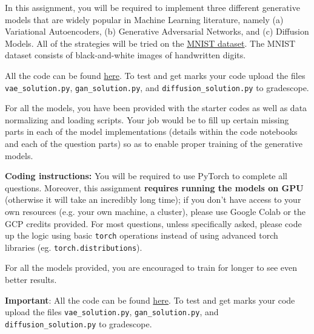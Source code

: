 \documentclass[12pt]{article}
\theoremstyle{definition}
\begin{document}
\renewcommand{\labelitemi}{\textbullet}

In this assignment, you will be required to implement three different generative models that are widely popular in Machine Learning literature, namely (a) Variational Autoencoders, (b) Generative Adversarial Networks, and (c) Diffusion Models. All of the strategies will be tried on the \href{https://huggingface.co/datasets/mnist}{MNIST dataset}. The MNIST dataset consists of black-and-white images of handwritten digits. 

All the code can be found \href{https://drive.google.com/file/d/1Y1IkDUFmEIocBRJd3cbt8747QEtMiM5R/view?usp=sharing}{here}. To test and get marks your code upload the files \texttt{vae\_solution.py}, \texttt{gan\_solution.py}, and \texttt{diffusion\_solution.py} to gradescope.

For all the models, you have been provided with the starter codes as well as data normalizing and loading scripts. Your job would be to fill up certain missing parts in each of the model implementations (details within the code notebooks and each of the question parts) so as to enable proper training of the generative models.

\textbf{Coding instructions:} You will be required to use PyTorch to complete all questions. Moreover, this assignment \textbf{requires running the models on GPU} (otherwise it will take an incredibly long time); if you don't have access to your own resources (e.g. your own machine, a cluster), please use Google Colab or the GCP credits provided. For most questions, unless specifically asked, please code up the logic using basic \texttt{torch} operations instead of using advanced torch libraries (eg. \texttt{torch.distributions}).

For all the models provided, you are encouraged to train for longer to see even better results.

\textbf{Important}: All the code can be found \href{https://drive.google.com/file/d/1Y1IkDUFmEIocBRJd3cbt8747QEtMiM5R/view?usp=sharing}{here}. To test and get marks your code upload the files \texttt{vae\_solution.py}, \texttt{gan\_solution.py}, and \texttt{diffusion\_solution.py} to gradescope.
\end{document}
